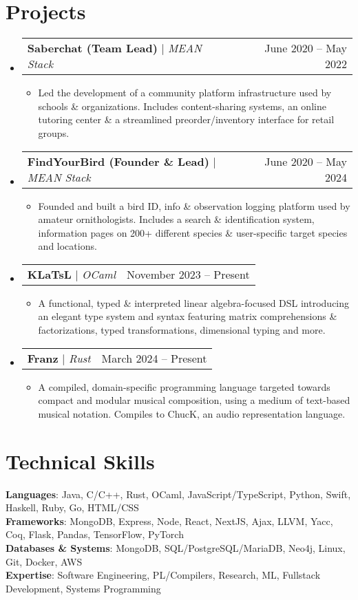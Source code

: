 \documentclass[letterpaper,11pt]{article}
\makeatletter
\newcommand{\resumeItem}[1]{
  \item\small{
    {#1 \vspace{-2pt}}
  }
}
\newcommand{\resumeProjectHeading}[2]{
    \item
    \begin{tabular*}{0.97\textwidth}{l@{\extracolsep{\fill}}r}
      \small#1 & #2 \\
    \end{tabular*}\vspace{-7pt}
}
\newcommand{\resumeSubHeadingListStart}{\begin{itemize}[leftmargin=0.15in, label={}]}
\newcommand{\resumeSubHeadingListEnd}{\end{itemize}}
\newcommand{\resumeItemListStart}{\begin{itemize}}
\newcommand{\resumeItemListEnd}{\end{itemize}\vspace{-5pt}}
\makeatother
\begin{document}
\section{Projects}
    \resumeSubHeadingListStart
      \resumeProjectHeading
          {\textbf{Saberchat (Team Lead)} $|$ \emph{MEAN Stack}}{June 2020 -- May 2022}
          \resumeItemListStart
            \resumeItem{Led the development of a community platform infrastructure used by schools \& organizations. Includes content-sharing systems, an online tutoring center \& a streamlined preorder/inventory interface for retail groups.\\[-1pt]}
          \resumeItemListEnd
      \resumeProjectHeading
          {\textbf{FindYourBird (Founder \& Lead)} $|$ \emph{MEAN Stack}}{June 2020 -- May 2024}
          \resumeItemListStart
            \resumeItem{Founded and built a bird ID, info \& observation logging platform used by amateur ornithologists. Includes a search \& identification system, information pages on 200+ different species \& user-specific target species and locations.\\[-2pt]}
          \resumeItemListEnd
      \resumeProjectHeading
          {\textbf{KLaTsL} $|$ \emph{OCaml}}{November 2023 -- Present}
          \resumeItemListStart
            \resumeItem{A functional, typed \& interpreted  linear algebra-focused DSL introducing an elegant type system and syntax featuring matrix comprehensions \& factorizations, typed transformations, dimensional typing and more.\\[-1pt]}
          \resumeItemListEnd
      \resumeProjectHeading
          {\textbf{Franz} $|$ \emph{Rust}}{March 2024 -- Present}
          \resumeItemListStart
            \resumeItem{A compiled, domain-specific programming language targeted towards compact and modular musical composition, using a medium of text-based musical notation. Compiles to ChucK, an audio representation language.\\[-2pt]}
          \resumeItemListEnd
    \resumeSubHeadingListEnd
%
\section{Technical Skills}
 \begin{itemize}[leftmargin=0.15in, label={}]
    \small{\item{
     \textbf{Languages}{: Java, C/C++, Rust,  OCaml, JavaScript/TypeScript, Python, Swift, Haskell, Ruby, Go, HTML/CSS} \\
     \textbf{Frameworks}{: MongoDB, Express, Node, React, NextJS, Ajax, LLVM, Yacc, Coq, Flask, Pandas, TensorFlow, PyTorch} \\
     \textbf{Databases \& Systems}{: MongoDB, SQL/PostgreSQL/MariaDB, Neo4j, Linux, Git, Docker, AWS}\\
     \textbf{Expertise}{: Software Engineering, PL/Compilers, Research, ML, Fullstack Development, Systems Programming} \\
    }}
 \end{itemize}


\end{document}
